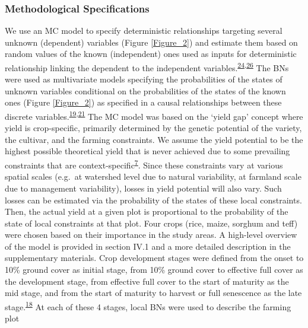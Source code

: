 \documentclass[11pt,preprint]{article}
\begin{document}
\hypertarget{methodological-specifications}{%
\subsubsection{Methodological
Specifications}\label{methodological-specifications}}

We use an MC model to specify deterministic relationships targeting
several unknown (dependent) variables (Figure \ref{Figure_2}) and
estimate them based on random values of the known (independent) ones
used as inputs for deterministic relationship linking the dependent to
the independent
variables.\textsuperscript{\protect\hyperlink{ref-Rosenstock_et_al_2014}{24},\protect\hyperlink{ref-Luedeling_et_al_2015}{26}}
The BNs were used as multivariate models specifying the probabilities of
the states of unknown variables conditional on the probabilities of the
states of the known ones (Figure \ref{Figure_2}) as specified in a
causal relationships between these discrete
variables.\textsuperscript{\protect\hyperlink{ref-Pearl_1988}{19},\protect\hyperlink{ref-Jensen_1996}{21}}
The MC model was based on the `yield gap' concept where yield is
crop-specific, primarily determined by the genetic potential of the
variety, the cultivar, and the farming constraints. We assume the yield
potential to be the highest possible theoretical yield that is never
achieved due to some prevailing constraints that are
context-specific\textsuperscript{\protect\hyperlink{ref-VanIttersum_et_al_2013}{7}}.
Since these constraints vary at various spatial scales (e.g.~at
watershed level due to natural variability, at farmland scale due to
management variability), losses in yield potential will also vary. Such
losses can be estimated via the probability of the states of these local
constraints. Then, the actual yield at a given plot is proportional to
the probability of the state of local constraints at that plot. Four
crops (rice, maize, sorghum and teff) were chosen based on their
importance in the study areas. A high-level overview of the model is
provided in section IV.1 and a more detailed description in the
supplementary materials. Crop development stages were defined from the
onset to 10\% ground cover as initial stage, from 10\% ground cover to
effective full cover as the development stage, from effective full cover
to the start of maturity as the mid stage, and from the start of
maturity to harvest or full senescence as the late
stage.\textsuperscript{\protect\hyperlink{ref-Allen_et_al_1998}{18}} At
each of these 4 stages, local BNs were used to describe the farming plot
\end{document}
